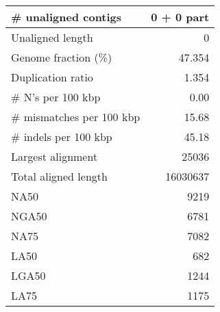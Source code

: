 \documentclass[12pt,a4paper]{article}
\begin{document}
\begin{table}[ht]
\begin{center}
\begin{tabular}{|l*{1}{|r}|}
\# unaligned contigs & 0 + 0 part \\ \hline
Unaligned length & 0 \\ \hline
Genome fraction (\%) & 47.354 \\ \hline
Duplication ratio & 1.354 \\ \hline
\# N's per 100 kbp & 0.00 \\ \hline
\# mismatches per 100 kbp & 15.68 \\ \hline
\# indels per 100 kbp & 45.18 \\ \hline
Largest alignment & 25036 \\ \hline
Total aligned length & 16030637 \\ \hline
NA50 & 9219 \\ \hline
NGA50 & 6781 \\ \hline
NA75 & 7082 \\ \hline
LA50 & 682 \\ \hline
LGA50 & 1244 \\ \hline
LA75 & 1175 \\ \hline
\end{tabular}
\end{center}
\end{table}
\end{document}
